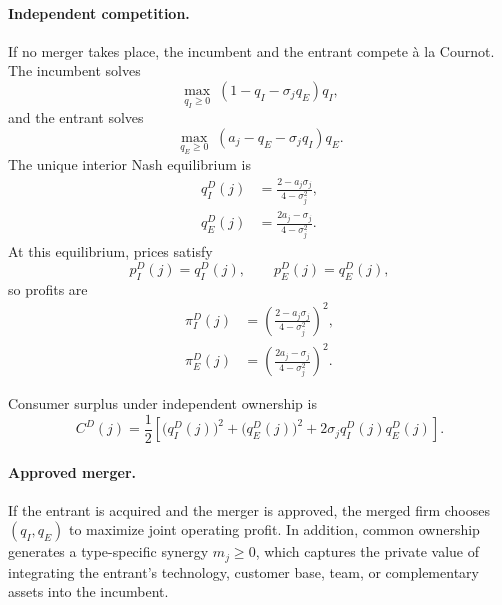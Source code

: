 \paragraph{Independent competition.}
If no merger takes place, the incumbent and the entrant compete \`a la Cournot.
The incumbent solves
\begin{equation}
    \max_{q_I \ge 0}\; (1-q_I-\sigma_j q_E)q_I,
\end{equation}
and the entrant solves
\begin{equation}
    \max_{q_E \ge 0}\; (a_j-q_E-\sigma_j q_I)q_E.
\end{equation}
The unique interior Nash equilibrium is
\begin{align}
    q_I^D(j) &= \frac{2-a_j\sigma_j}{4-\sigma_j^2}, \\
    q_E^D(j) &= \frac{2a_j-\sigma_j}{4-\sigma_j^2}.
\end{align}
At this equilibrium, prices satisfy
\begin{equation}
    p_I^D(j)=q_I^D(j),
    \qquad
    p_E^D(j)=q_E^D(j),
\end{equation}
so profits are
\begin{align}
    \pi_I^D(j) &= \left(\frac{2-a_j\sigma_j}{4-\sigma_j^2}\right)^2, \\
    \pi_E^D(j) &= \left(\frac{2a_j-\sigma_j}{4-\sigma_j^2}\right)^2.
\end{align}

Consumer surplus under independent ownership is
\begin{equation}\label{eq:csd}
    C^D(j)
    =
    \frac{1}{2}
    \left[
        \bigl(q_I^D(j)\bigr)^2
        + \bigl(q_E^D(j)\bigr)^2
        + 2\sigma_j q_I^D(j)q_E^D(j)
    \right].
\end{equation}

\paragraph{Approved merger.}
If the entrant is acquired and the merger is approved, the merged firm chooses \((q_I,q_E)\) to maximize joint operating profit.
In addition, common ownership generates a type-specific synergy \(m_j \ge 0\), which captures the private value of integrating the entrant's technology, customer base, team, or complementary assets into the incumbent.

